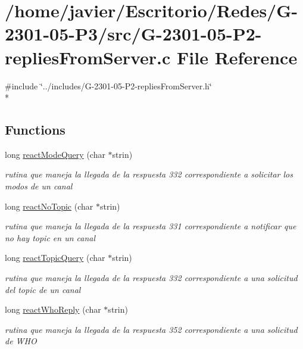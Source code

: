 \hypertarget{_g-2301-05-_p2-replies_from_server_8c}{\section{/home/javier/\-Escritorio/\-Redes/\-G-\/2301-\/05-\/\-P3/src/\-G-\/2301-\/05-\/\-P2-\/replies\-From\-Server.c File Reference}
\label{_g-2301-05-_p2-replies_from_server_8c}
}
{\ttfamily \#include \char`\"{}../includes/\-G-\/2301-\/05-\/\-P2-\/replies\-From\-Server.\-h\char`\"{}}\\*
\subsection*{Functions}
\begin{DoxyCompactItemize}
\item 
long \hyperlink{_g-2301-05-_p2-replies_from_server_8c_a2ecfb7128199b664a1232e6adaa13b1d}{react\-Mode\-Query} (char $\ast$strin)
\begin{DoxyCompactList}\small\item\em rutina que maneja la llegada de la respuesta 332 correspondiente a solicitar los modos de un canal \end{DoxyCompactList}\item 
long \hyperlink{_g-2301-05-_p2-replies_from_server_8c_a0fab1e2795c83c39f5e728b150a73195}{react\-No\-Topic} (char $\ast$strin)
\begin{DoxyCompactList}\small\item\em rutina que maneja la llegada de la respuesta 331 correspondiente a notificar que no hay topic en un canal \end{DoxyCompactList}\item 
long \hyperlink{_g-2301-05-_p2-replies_from_server_8c_a46cb9b388176d279b37de41cef5a0d40}{react\-Topic\-Query} (char $\ast$strin)
\begin{DoxyCompactList}\small\item\em rutina que maneja la llegada de la respuesta 332 correspondiente a una solicitud del topic de un canal \end{DoxyCompactList}\item 
long \hyperlink{_g-2301-05-_p2-replies_from_server_8c_a76b90dab2968c81d3006f5c05978fb39}{react\-Who\-Reply} (char $\ast$strin)
\begin{DoxyCompactList}\small\item\em rutina que maneja la llegada de la respuesta 352 correspondiente a una solicitud de W\-H\-O \end{DoxyCompactList}\end{DoxyCompactItemize}



